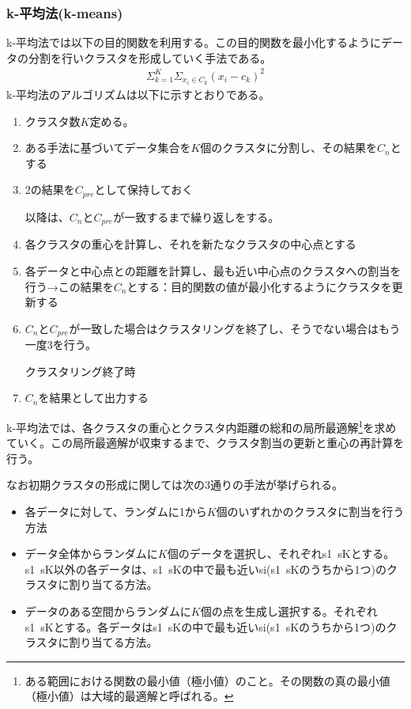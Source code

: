 \documentclass[dvipdfmx]{jsarticle}
\begin{document}
\subsubsection{k-平均法(k-means)}
k-平均法では以下の目的関数を利用する。この目的関数を最小化するようにデータの分割を行いクラスタを形成していく手法である。
\begin{gather*}
  \Sigma_{k=1}^{K}\Sigma_{x_{i}\in C_{k}}(x_{i}-c_{k})^{2}
\end{gather*}
k-平均法のアルゴリズムは以下に示すとおりである。
\begin{enumerate}
  \item クラスタ数$K$定める。
  \item ある手法に基づいてデータ集合を$K$個のクラスタに分割し、その結果を$C_{n}$とする
  \item 2の結果を$C_{pre}$として保持しておく\par
  以降は、$C_{n}$と$C_{pre}$が一致するまで繰り返しをする。
  \item 各クラスタの重心を計算し、それを新たなクラスタの中心点とする
  \item 各データと中心点との距離を計算し、最も近い中心点のクラスタへの割当を行う→この結果を$C_{n}$とする：目的関数の値が最小化するようにクラスタを更新する
  \item $C_{n}$と$C_{pre}$が一致した場合はクラスタリングを終了し、そうでない場合はもう一度3を行う。\par
  クラスタリング終了時
  \item $C_{n}$を結果として出力する
\end{enumerate}
k-平均法では、各クラスタの重心とクラスタ内距離の総和の局所最適解\footnote{ある範囲における関数の最小値（極小値）のこと。その関数の真の最小値（極小値）は大域的最適解と呼ばれる。}を求めていく。この局所最適解が収束するまで、クラスタ割当の更新と重心の再計算を行う。\par
なお初期クラスタの形成に関しては次の3通りの手法が挙げられる。
\begin{itemize}
  \item 各データに対して、ランダムに1から$K$個のいずれかのクラスタに割当を行う方法
  \item データ全体からランダムに$K$個のデータを選択し、それぞれ{s1~sK}とする。{s1~sK}以外の各データは、{s1~sK}の中で最も近いsi(s1~sKのうちから1つ)のクラスタに割り当てる方法。
  \item データのある空間からランダムに$K$個の点を生成し選択する。それぞれ{s1~sK}とする。各データは{s1~sK}の中で最も近いsi(s1~sKのうちから1つ)のクラスタに割り当てる方法。
\end{itemize}
\end{document}
